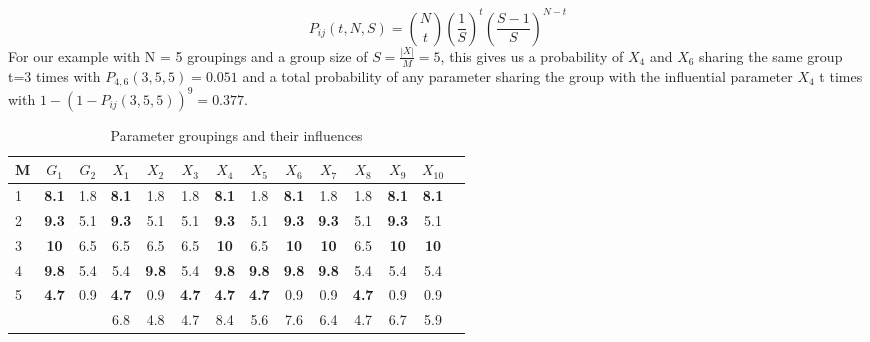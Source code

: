 \documentclass[../../thesis.tex]{subfiles}
\begin{document}
\begin{equation}
    P_{ij}(t,N,S) = \binom{N}{t} \left(\frac{1}{S}\right)^{t} \left(\frac{S-1}{S}\right)^{N-t}
\end{equation}\label{eq:group_sampling:probability}
For our example with N = 5 groupings and a group size of $S = \frac{|X|}{M} = 5$, this gives us a probability
of $X_4$ and $ X_6 $ sharing the same group t=3 times with $P_{4,6}(3,5,5) = 0.051 $ and a total
probability of any parameter sharing the group with the influential parameter $X_4$ t times with $1-(1-P_{ij}(3,5,5))^9 = 0.377$.

\begin{table}[]
    \caption{Parameter groupings and their influences }
    \begin{center}
        \begin{tabular}{lcc|ccccccccccc}\toprule
            M & $G_1$        & $G_2$ & $X_1$        & $X_2$        & $X_3$        & $X_4$        & $X_5$        & $X_6$        & $X_7$        & $X_8$        & $X_9$        & $X_{10}$     \\ \midrule
            1 & \textbf{8.1} & 1.8   & \textbf{8.1} & 1.8          & 1.8          & \textbf{8.1} & 1.8          & \textbf{8.1} & 1.8          & 1.8          & \textbf{8.1} & \textbf{8.1} \\
            2 & \textbf{9.3} & 5.1   & \textbf{9.3} & 5.1          & 5.1          & \textbf{9.3} & 5.1          & \textbf{9.3} & \textbf{9.3} & 5.1          & \textbf{9.3} & 5.1          \\
            3 & \textbf{10}  & 6.5   & 6.5          & 6.5          & 6.5          & \textbf{10}  & 6.5          & \textbf{10}  & \textbf{10}  & 6.5          & \textbf{10}  & \textbf{10}  \\
            4 & \textbf{9.8} & 5.4   & 5.4          & \textbf{9.8} & 5.4          & \textbf{9.8} & \textbf{9.8} & \textbf{9.8} & \textbf{9.8} & 5.4          & 5.4          & 5.4          \\
            5 & \textbf{4.7} & 0.9   & \textbf{4.7} & 0.9          & \textbf{4.7} & \textbf{4.7} & \textbf{4.7} & 0.9          & 0.9          & \textbf{4.7} & 0.9          & 0.9          \\ \midrule
              &              &       & 6.8          & 4.8          & 4.7          & 8.4          & 5.6          & 7.6          & 6.4          & 4.7          & 6.7          & 5.9
        \end{tabular}
    \end{center}\label{tab:group_sampling_groups}%
\end{table}
\end{document}
